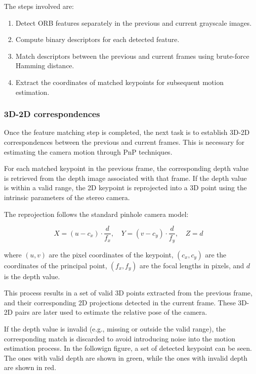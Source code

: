 The steps involved are:

\begin{enumerate}
  \item Detect \gls{ORB} features separately in the previous and current grayscale images.
  \item Compute binary descriptors for each detected feature.
  \item Match descriptors between the previous and current frames using brute-force Hamming distance.
  \item Extract the coordinates of matched keypoints for subsequent motion estimation.
\end{enumerate}

\subsubsection{3D-2D correspondences}\label{sec:3D2DCorrespondences}

Once the feature matching step is completed, the next task is to establish 3D-2D correspondences
between the previous and current frames. This is necessary for estimating the camera motion through
\gls{PnP} techniques.

For each matched keypoint in the previous frame, the corresponding depth value is retrieved from the
depth image associated with that frame. If the depth value is within a valid range, the 2D keypoint is
reprojected into a 3D point using the intrinsic parameters of the stereo camera.

The reprojection follows the standard pinhole camera model:

\begin{equation}
X = (u - c_x) \cdot \frac{d}{f_x}, \quad
Y = (v - c_y) \cdot \frac{d}{f_y}, \quad
Z = d
\end{equation}

where $(u, v)$ are the pixel coordinates of the keypoint, $(c_x, c_y)$ are the coordinates of the principal
point, $(f_x, f_y)$ are the focal lengths in pixels, and $d$ is the depth value.

This process results in a set of valid 3D points extracted from the previous frame, and their corresponding
2D projections detected in the current frame. These 3D-2D pairs are later used to estimate the relative
pose of the camera.

If the depth value is invalid (e.g., missing or outside the valid range), the corresponding match is
discarded to avoid introducing noise into the motion estimation process. In the followign figure, a 
set of detected keypoint can be seen. The ones with valid depth are shown in green, while the ones with invalid depth are shown in red.

